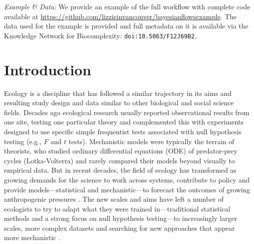 \documentclass[11pt]{article}
\newcommand{\R}[1]{\label{}\linelabel{#1}}
\begin{document}
\vspace{3ex}
\noindent\emph{Example \& Data:} We provide an example of the full workflow with complete code available at \url{https://github.com/lizzieinvancouver/bayesianflowsexample}. The data used for the example is provided and full metadata on it is available via the Knowledge Network for Biocomplexity: \verb|doi:10.5063/F12J69B2|. 



\setlength{\parindent}{0pt}
\setlength{\parskip}{7pt}

\newpage

\section*{Introduction}
\R{newintrostart}Ecology is a discipline that has followed a similar trajectory in its aims and resulting study design and data similar to other biological and social science fields. Decades ago ecological research usually reported observational results from one site, testing one particular theory and complemented this with experiments designed to use specific simple frequentist tests associated with null hypothesis testing (e.g., $F$ and $t$ tests). Mechanistic models were typically the terrain of theorists, who studied ordinary differential equations (ODE) of predator-prey cycles (Lotka-Volterra) and rarely compared their models beyond visually to empirical data. But in recent decades, the field of ecology has transformed as growing demands for the science to work across systems, contribute to policy and provide models---statistical and mechanistic---to forecast the outcomes of growing anthropogenic pressures \citep{hak2016sustainable,lindenmayer2010science}. The new scales and aims have left a number of ecologists to try to adapt what they were trained in---traditional statistical methods and a strong focus on null hypothesis testing---to increasingly larger scales, more complex datasets and searching for new approaches that appear more mechanistic \citep{grace2024integrative,grace2025causal}. 
\end{document}
